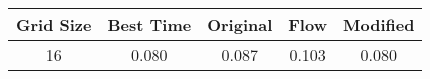 \begin{tabular}{|c|c|c|c|c|}
\hline
Grid Size & Best Time & Original & Flow & Modified \\
\hline
16 & 0.080 & 0.087 & 0.103 & 0.080 \\
\hline
\end{tabular}